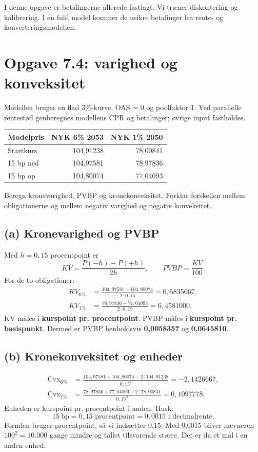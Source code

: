 \documentclass[11pt,a4paper]{article}
\newcommand{\opgave}[1]{\section*{#1}}
\newcommand{\del}[1]{\subsection*{#1}}
\newcommand{\bp}{\text{bp}}
\begin{document}
I denne opgave er betalingerne allerede fastlagt. Vi træner diskontering og kalibrering. I en fuld model kommer de usikre betalinger fra rente- og konverteringsmodellen.

\newpage
\opgave{Opgave 7.4: varighed og konveksitet}
\begin{tcolorbox}[title=Opgavebeskrivelse]
Modellen bruger en flad 3\%-kurve, OAS = 0 og poolfaktor 1. Ved parallelle rentestød genberegnes modellens CPR og betalinger; øvrige input fastholdes.
\begin{center}\begin{tabular}{lrr}\toprule
Modelpris & NYK 6\% 2053 & NYK 1\% 2050\\\midrule
Startkurs & 104,91238 & 78,00841\\
15 bp ned & 104,97581 & 78,97836\\
15 bp op & 104,80074 & 77,04093\\\bottomrule
\end{tabular}\end{center}
Beregn kronevarighed, PVBP og kronekonveksitet. Forklar forskellen mellem obligationerne og mellem negativ varighed og negativ konveksitet.
\end{tcolorbox}
\del{(a) Kronevarighed og PVBP}
Med $h=0{,}15$ procentpoint er
\[
KV=\frac{P(-h)-P(+h)}{2h},\qquad PVBP=\frac{KV}{100}.
\]
For de to obligationer:
\[
\begin{aligned}
KV_{6\%}&=\frac{104{,}97581-104{,}80074}{2\cdot0{,}15}=0{,}5835667,\\
KV_{1\%}&=\frac{78{,}97836-77{,}04093}{2\cdot0{,}15}=6{,}4581000.
\end{aligned}
\]
KV måles i \textbf{kurspoint pr. procentpoint}. PVBP måles i \textbf{kurspoint pr. basispunkt}. Dermed er PVBP henholdsvis \textbf{0,0058357} og \textbf{0,0645810}.

\del{(b) Kronekonveksitet og enheder}
\[
\begin{aligned}
\mathrm{Cvx}_{6\%}&=\frac{104{,}97581+104{,}80074-2\cdot104{,}91238}{0{,}15^2}
=\boxed{-2{,}1426667},\\
\mathrm{Cvx}_{1\%}&=\frac{78{,}97836+77{,}04093-2\cdot78{,}00841}{0{,}15^2}
=\boxed{0{,}1097778}.
\end{aligned}
\]
Enheden er kurspoint pr. procentpoint i anden. Husk:
\[
15\ \bp=0{,}15\text{ procentpoint}=0{,}0015\text{ i decimalrente}.
\]
Formlen bruger procentpoint, så vi indsætter 0,15. Med 0,0015 bliver nævneren $100^2=10.000$ gange mindre og tallet tilsvarende større. Det er da et mål i en anden enhed.
\end{document}

